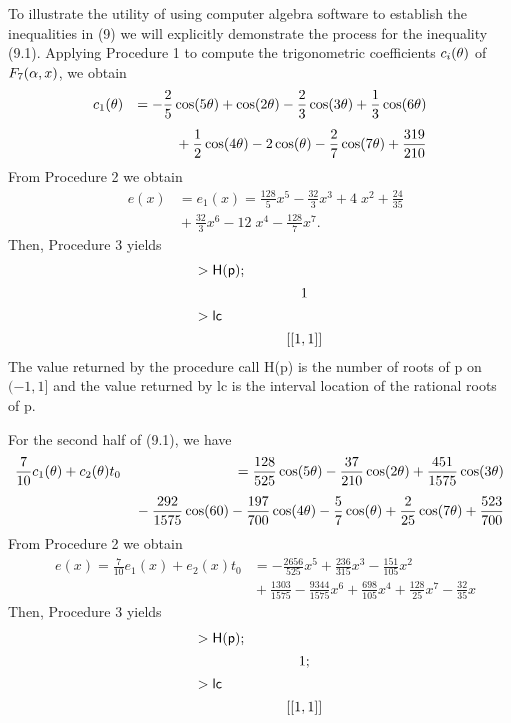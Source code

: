 To illustrate the utility of using computer algebra software to
establish the inequalities in (9) we will explicitly demonstrate the
process for the inequality (9.1).  Applying Procedure 1 to compute
the trigonometric coefficients $c_i(\theta)$ of $F_7(\alpha,x)$, we obtain
\begin{eqnarray*}
& c_1(\theta) & = - \frac{2}{5} \cos(5\theta) + \cos(2 \theta) - \frac{2}{3}
\cos(3\theta) + \frac{1}{3} \cos(6\theta)\\[1ex]
&& \mbox{} + \frac{1}{2} \cos(4\theta) - 2\cos(\theta) - \frac{2}{7} 
\cos(7\theta) + \frac{319}{210}
\end{eqnarray*}
From Procedure 2 we obtain
\begin{eqnarray*}
& e(x) & = e_1(x) = \frac{128}{5}x^5-\frac{32}{3}x^3+4\;x^2+ 
\frac{24}{35}\\[1ex]
&& \mbox{} + \frac{32}{3}x^6-12\;x^4-\frac{128}{7}x^7.
\end{eqnarray*}
Then, Procedure 3 yields
$$
\begin{array}{lccc} >{\sf H(p)};\\[1ex] &&& 1\\[1ex] >{\sf lc}\\[1ex]
&&& [[1,1]]\end{array}
$$
The value returned by the procedure call {\sf H(p)} is the number of
roots of {\sf p} on $(-1,1]$ and the value returned by {\sf lc} is
the interval location of the rational roots of {\sf p}.

For the second half of (9.1), we have
\begin{eqnarray*}
& \frac{7}{10}c_1(\theta)+c_2(\theta)t_0 & = \frac{128}{525} \cos(5\theta) - 
\frac{37}{210} \cos(2\theta) + \frac{451}{1575} \cos(3\theta)\\[1ex]
&& \mbox{}-\frac{292}{1575}\cos(60)-\frac{197}{700}\cos(4\theta)- 
\frac{5}{7}\cos(\theta)+\frac{2}{25}\cos(7\theta)+\frac{523}{700}
\end{eqnarray*}
From Procedure 2 we obtain
\begin{eqnarray*}
& e(x)=\frac{7}{10}e_1(x)+e_2(x)t_0 & =-\frac{2656}{525}x^5+ 
\frac{236}{315}x^3-\frac{151}{105}x^2\\[1ex]
&& \mbox{} +\frac{1303}{1575}-\frac{9344}{1575}x^6+ 
\frac{698}{105}x^4+\frac{128}{25}x^7-\frac{32}{35}x
\end{eqnarray*}
Then, Procedure 3 yields
$$
\begin{array}{lccc} >{\sf H(p)};\\[1ex] &&& 1;\\[1ex] 
>{\sf lc}\\[1ex] &&& [[1,1]]\end{array}
$$

